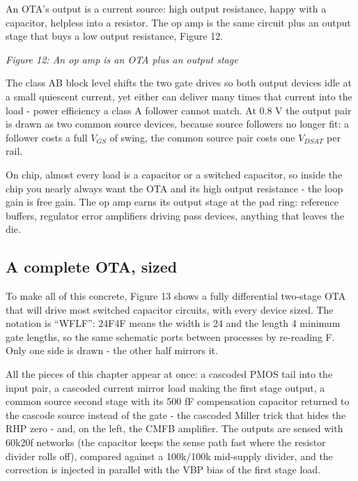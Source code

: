 An OTA's output is a current source: high output resistance, happy with
a capacitor, helpless into a resistor. The op amp is the same circuit
plus an output stage that buys a low output resistance, Figure 12.


{
\centering
{}
}

\emph{Figure 12: An op amp is an OTA plus an output stage}

The class AB block level shifts the two gate drives so both output
devices idle at a small quiescent current, yet either can deliver many
times that current into the load - power efficiency a class A follower
cannot match. At 0.8 V the output pair is drawn as two common source
devices, because source followers no longer fit: a follower costs a full
\(V_{GS}\) of swing, the common source pair costs one \(V_{DSAT}\) per
rail.

On chip, almost every load is a capacitor or a switched capacitor, so
inside the chip you nearly always want the OTA and its high output
resistance - the loop gain is free gain. The op amp earns its output
stage at the pad ring: reference buffers, regulator error amplifiers
driving pass devices, anything that leaves the die.

\subsection{A complete OTA, sized}\label{a-complete-ota-sized}

To make all of this concrete, Figure 13 shows a fully differential
two-stage OTA that will drive most switched capacitor circuits, with
every device sized. The notation is ``WFLF'': 24F4F means the width is
24 and the length 4 minimum gate lengths, so the same schematic ports
between processes by re-reading F. Only one side is drawn - the other
half mirrors it.

All the pieces of this chapter appear at once: a cascoded PMOS tail into
the input pair, a cascoded current mirror load making the first stage
output, a common source second stage with its 500 fF compensation
capacitor returned to the cascode source instead of the gate - the
cascoded Miller trick that hides the RHP zero - and, on the left, the
CMFB amplifier. The outputs are sensed with 60k\textbar\textbar20f
networks (the capacitor keeps the sense path fast where the resistor
divider rolls off), compared against a 100k/100k mid-supply divider, and
the correction is injected in parallel with the VBP bias of the first
stage load.


